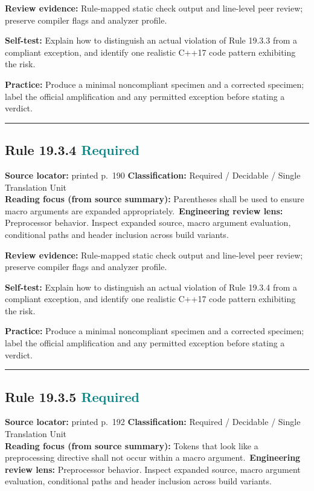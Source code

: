 \documentclass[10pt,letterpaper]{article}
\begin{document}
\textbf{Review evidence:} Rule-mapped static check output and line-level peer review; preserve compiler flags and analyzer profile.

\textbf{Self-test:} Explain how to distinguish an actual violation of Rule 19.3.3 from a compliant exception, and identify one realistic C++17 code pattern exhibiting the risk.\par
\textbf{Practice:} Produce a minimal noncompliant specimen and a corrected specimen; label the official amplification and any permitted exception before stating a verdict.
\smallskip\hrule\smallskip
\subsection*{Rule 19.3.4 \enspace \texorpdfstring{\small\textcolor{teal}{Required}}{Required}}
\noindent\textbf{Source locator:} printed p.~190 \quad\textbf{Classification:} Required / Decidable / Single Translation Unit\\
\textbf{Reading focus (from source summary):} Parentheses shall be used to ensure macro arguments are expanded appropriately.\
\textbf{Engineering review lens:} Preprocessor behavior. Inspect expanded source, macro argument evaluation, conditional paths and header inclusion across build variants.

\textbf{Review evidence:} Rule-mapped static check output and line-level peer review; preserve compiler flags and analyzer profile.

\textbf{Self-test:} Explain how to distinguish an actual violation of Rule 19.3.4 from a compliant exception, and identify one realistic C++17 code pattern exhibiting the risk.\par
\textbf{Practice:} Produce a minimal noncompliant specimen and a corrected specimen; label the official amplification and any permitted exception before stating a verdict.
\smallskip\hrule\smallskip
\subsection*{Rule 19.3.5 \enspace \texorpdfstring{\small\textcolor{teal}{Required}}{Required}}
\noindent\textbf{Source locator:} printed p.~192 \quad\textbf{Classification:} Required / Decidable / Single Translation Unit\\
\textbf{Reading focus (from source summary):} Tokens that look like a preprocessing directive shall not occur within a macro argument.\
\textbf{Engineering review lens:} Preprocessor behavior. Inspect expanded source, macro argument evaluation, conditional paths and header inclusion across build variants.
\end{document}
